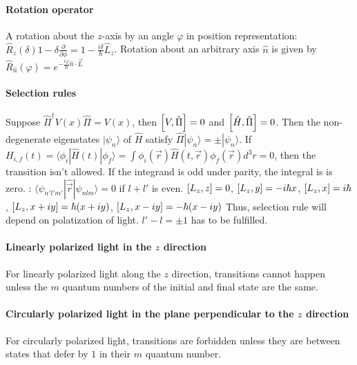 \paragraph{Rotation operator}
A rotation about the $z$-axis by an angle $\varphi$ in position representation:
$\hat{R}_z(\delta) 1 - \delta \frac{\partial}{\partial \phi} = 1 - \frac{i \delta}{\hbar} \hat{L}_z$.
Rotation about an arbitrary axis $\hat{n}$ is given by $\hat{R}_{\hat{n}}(\varphi)
= e^{- \frac{i \varphi}{\hbar} \hat{n} \cdot \vec{L}}$

\paragraph{Selection rules}
Suppose $\hat{\Pi}^\dagger V(x) \hat{\Pi} = V(x)$, then
$\left[ V,\hat{\Pi} \right] = 0$ and $\left[ \hat{H},\hat{\Pi} \right] = 0$.
Then the non-degenerate eigenstates $| \psi_n \rangle$ of $\hat{H}$ satisfy
$\hat{\Pi} | \psi_n \rangle = \pm | \psi_n \rangle$.
If $H_{i,f}(t) = \langle \phi_i | \hat{H}(t) | \phi_f \rangle
= \int \phi_i(\vec{r}) \hat{H}(t,\vec{r}) \phi_f(\vec{r}) d^3 r = 0$, then
the transition isn't allowed. If the integrand is odd under parity, the integral is
is zero. : $\langle \psi_{n'l'm'} | \hat{\vec{r}} | \psi_{nlm} \rangle = 0$
if $l+l'$ is even.
$\left[ L_z , z \right] = 0$, $\left[ L_z ,y \right] = -i \hbar x$,
$\left[ L_z ,x  \right] = i \hbar $,
$\left[ L_z , x + iy \right] = \hbar (x+iy)$,
$\left[ L_z , x - iy \right] = - \hbar (x-iy)$
Thus, selection rule will depend on polatization of light.
$l' - l = \pm 1$ has to be fulfilled.

\paragraph{Linearly polarized light in the $z$ direction}
For linearly polarized light along the $z$ direction, transitions cannot happen
unless the $m$ quantum numbers of the initial and final state are the same.

\paragraph{Circularly polarized light in the plane perpendicular to the $z$ direction}
For circularly polarized light, transitions are forbidden
unless they are between states that defer by $1$ in their $m$ quantum number.


